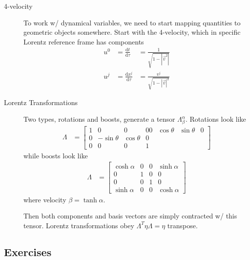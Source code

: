 \documentclass[12pt]{report}
\newcommand{\rd}[2]{\frac{\mathrm{d}#1}{\mathrm{d}#2}}
\newcommand{\abs}[1]{\left|#1\right|}
\begin{document}
\begin{description}
    \item[4-velocity] To work w/ dynamical variables, we need to start mapping
        quantities to geometric objects somewhere. Start with the 4-velocity,
        which in specific Lorentz reference frame has components
        \begin{align}
            u^0 &= \rd{t}{\tau} &= \frac{1}{\sqrt{1 - \abs{\vec{v}^2}}} \nonumber\\
            u^j &= \rd{x^j}{\tau} &= \frac{v^j}{\sqrt{1 - \abs{\vec{v}}^2}}
        \end{align}

    \item[Lorentz Transformations] Two types, rotations and boosts, generate a
        tensor $\Lambda^\alpha_\beta$. Rotations look like
        \begin{align}
            \Lambda &= \begin{bmatrix}
            1 & 0 & 0 & 0
            0 & \cos\theta & \sin\theta & 0\\
            0 & -\sin\theta & \cos\theta & 0\\
            0 & 0 & 0 & 1
            \end{bmatrix}
        \end{align}
        while boosts look like
        \begin{align}
            \Lambda &= \begin{bmatrix}
                \cosh \alpha & 0 & 0 & \sinh\alpha\\
                0 & 1 & 0 & 0\\
                0 & 0 & 1 & 0\\
                \sinh\alpha & 0 & 0 & \cosh\alpha
            \end{bmatrix}
        \end{align}
        where velocity $\beta = \tanh \alpha$.

        Then both components and basis vectors are simply contracted w/ this
        tensor. Lorentz transformations obey $\Lambda^T \eta \Lambda = \eta$
        transpose.
\end{description}

\subsection{Exercises}
\end{document}
